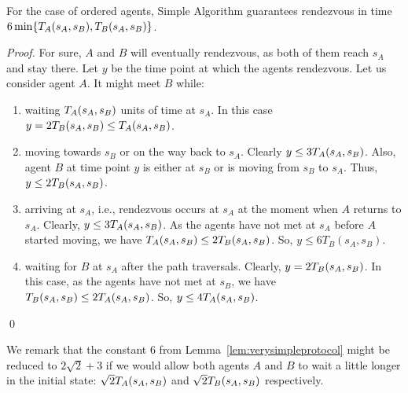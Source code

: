 \documentclass{llncs}
\newcommand{\simplealgorithm}{Simple Algorithm}
\newcommand{\dist}[4][]{\if!#1!T_{#2}(#3,#4)\else T_{#2}(#3,#4,#1)\fi}
\newcommand{\startpos}[1]{s_{#1}}
\newcommand{\starta}{\startpos{A}}
\newcommand{\startb}{\startpos{B}}
\begin{document}
\begin{lemma} \label{lem:verysimpleprotocol}
For the case of ordered agents, {\simplealgorithm} guarantees rendezvous in time $6 \min \{ \dist{A}{\starta}{\startb}, \dist{B}{\starta}{\startb}\}$.
\end{lemma}
\begin{proof}	
For sure, $A$ and $B$ will eventually rendezvous, as both of them reach $\starta$ and stay there.
Let $y$ be the time point at which the agents rendezvous.
Let us consider agent $A$. It might meet $B$ while:
\begin{enumerate}
	\item waiting $\dist{A}{\starta}{\startb}$ units of time at $\starta$. In this case $y = 2\dist{B}{\starta}{\startb}  \leq  \dist{A}{\starta}{\startb}$.
	\item moving towards $\startb$ or on the way back to $\starta$.
              Clearly $y \leq  3\dist{A}{\starta}{\startb}$.
              Also, agent $B$ at time point $y$ is either at $\startb$ or is moving from $\startb$ to $\starta$.
              Thus, $y \leq 2\dist{B}{\starta}{\startb}$.
	
	
	\item arriving at $\starta$, i.e., rendezvous occurs at $\starta$ at the moment when $A$ returns to $\starta$.
              Clearly, $y\leq 3\dist{A}{\starta}{\startb}$.
              As the agents have not met at $\starta$ before $A$ started moving, we have $\dist{A}{\starta}{\startb}\leq 2\dist{B}{\starta}{\startb}$.
	      So, $y\leq 6T_B(\starta,\startb)$.

	\item waiting for $B$ at $\starta$ after the path traversals.
              Clearly, $y=2\dist{B}{\starta}{\startb}$.
              In this case, as the agents have not met at $\startb$, we have $\dist{B}{\starta}{\startb} \leq 2\dist{A}{\starta}{\startb}$.
	      So, $y\leq 4\dist{A}{\starta}{\startb}$.
	
\end{enumerate}
\qed\end{proof}

We remark that the constant $6$ from Lemma~\ref{lem:verysimpleprotocol} might be reduced to $2\sqrt{2}+3$
if we would allow both agents $A$ and $B$ to wait a little longer in the initial state:
$\sqrt{2} \dist{A}{\starta}{\startb}$ and $\sqrt{2} \dist{B}{\starta}{\startb}$ respectively.
\end{document}
